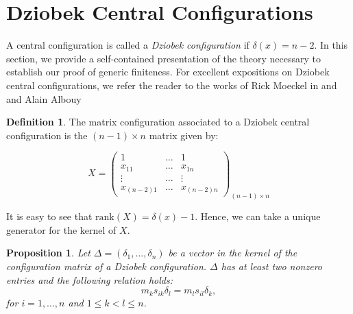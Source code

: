 \documentclass{amsart}
\newtheorem{proposition}[theorem]{Proposition}
\theoremstyle{definition}
\newtheorem{definition}[theorem]{Definition}
\theoremstyle{remark}
\numberwithin{equation}{section}
\begin{document}
\section{Dziobek Central Configurations}\label{sec:dzio}

A central configuration is called a \textit{Dziobek configuration} if $\delta(x)=n-2$. In this section, we provide a self-contained presentation of the theory necessary to establish our proof of generic finiteness. For excellent expositions on Dziobek central configurations, we refer the reader to the works of Rick Moeckel in \cite{moeckel2001generic} and \cite{moeckel2014lectures} and Alain Albouy \cite{albouy2003paper}

\begin{definition}
    The matrix configuration associated to a Dziobek central configuration is the $(n-1) \times n$ matrix given by:

$$X= \begin{pmatrix}
1 & \dots & 1 \\
x_{11} & \dots & x_{1n} \\
\vdots & \dots & \vdots \\
x_{(n-2)1} & \dots & x_{(n-2)n} 
\end{pmatrix}_{(n-1) \times n}$$
\end{definition}


It is easy to see that $\text{rank}(X)=\delta(x)-1$. Hence, we can take a unique generator for the kernel of $X$.






\begin{proposition}\label{propmsd}
Let $\Delta=(\delta_1, \dots, \delta_n)$ be a vector in the kernel of the configuration matrix of a Dziobek configuration. $\Delta$ has at least two nonzero entries and the following relation holds:
\begin{equation}\label{eqmsd}
    m_k s_{ik}\delta_l = m_l s_{il}\delta_k,
\end{equation}
for $i=1,\dots,n$ and $1 \leq k<l \leq n$.
\end{proposition}
\end{document}
